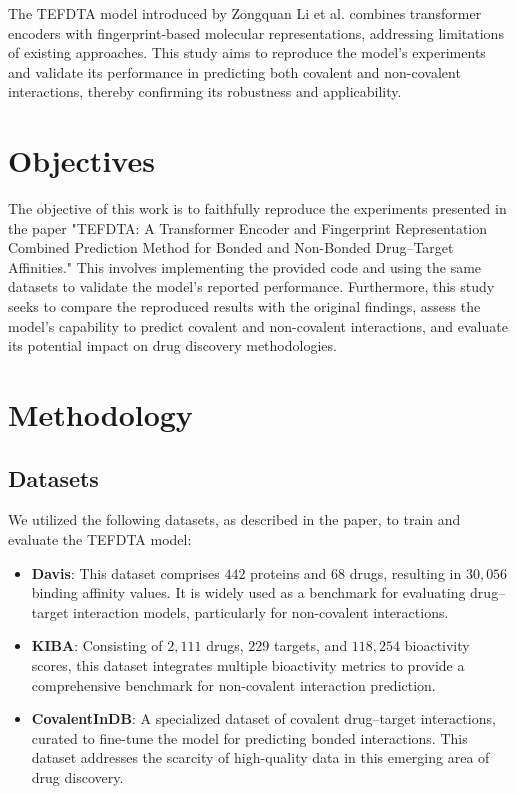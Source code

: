 \documentclass{article}
\begin{document}
The TEFDTA model introduced by Zongquan Li et al. combines transformer encoders with fingerprint-based molecular representations, addressing limitations of existing approaches. This study aims to reproduce the model’s experiments and validate its performance in predicting both covalent and non-covalent interactions, thereby confirming its robustness and applicability.

\section{Objectives}

The objective of this work is to faithfully reproduce the experiments presented in the paper "TEFDTA: A Transformer Encoder and Fingerprint Representation Combined Prediction Method for Bonded and Non-Bonded Drug–Target Affinities." This involves implementing the provided code and using the same datasets to validate the model's reported performance. Furthermore, this study seeks to compare the reproduced results with the original findings, assess the model's capability to predict covalent and non-covalent interactions, and evaluate its potential impact on drug discovery methodologies.

\section{Methodology}
\subsection{Datasets}

We utilized the following datasets, as described in the paper, to train and evaluate the TEFDTA model:

\begin{itemize} \item \textbf{Davis}: This dataset comprises $442$ proteins and $68$ drugs, resulting in $30,056$ binding affinity values. It is widely used as a benchmark for evaluating drug–target interaction models, particularly for non-covalent interactions. \item \textbf{KIBA}: Consisting of $2,111$ drugs, $229$ targets, and $118,254$ bioactivity scores, this dataset integrates multiple bioactivity metrics to provide a comprehensive benchmark for non-covalent interaction prediction. \item \textbf{CovalentInDB}: A specialized dataset of covalent drug–target interactions, curated to fine-tune the model for predicting bonded interactions. This dataset addresses the scarcity of high-quality data in this emerging area of drug discovery. \end{itemize}
\end{document}
